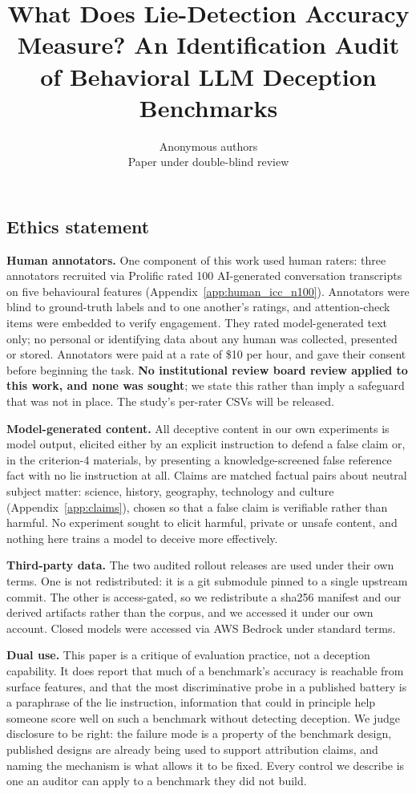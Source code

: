 \documentclass{article} %
\title{What Does Lie-Detection Accuracy Measure? An Identification Audit of Behavioral LLM Deception Benchmarks}
\author{Anonymous authors\\
Paper under double-blind review}
\begin{document}
\maketitle








\subsection*{Ethics statement}
\label{sec:ethics}
\textbf{Human annotators.} One component of this work used human raters: three
annotators recruited via Prolific rated 100 AI-generated conversation transcripts
on five behavioural features (Appendix~\ref{app:human_icc_n100}). Annotators were
blind to ground-truth labels and to one another's ratings, and attention-check
items were embedded to verify engagement. They rated model-generated text only;
no personal or identifying data about any human was collected, presented or
stored. Annotators were paid at a rate of \$10 per hour, and gave their consent
before beginning the task. \textbf{No institutional review board review applied
to this work, and none was sought}; we state this rather than imply a safeguard
that was not in place. The study's per-rater CSVs will be released.

\textbf{Model-generated content.} All deceptive content in our own experiments is
model output, elicited either by an explicit instruction to defend a false claim
or, in the criterion-4 materials, by presenting a knowledge-screened false
reference fact with no lie instruction at all. Claims are matched factual pairs
about neutral subject matter: science, history, geography, technology and culture
(Appendix~\ref{app:claims}), chosen so that a false claim is verifiable rather
than harmful. No experiment sought to elicit harmful, private or unsafe content,
and nothing here trains a model to deceive more effectively.

\textbf{Third-party data.} The two audited rollout releases are used under their
own terms. One is not redistributed: it is a git submodule pinned to a single
upstream commit. The other is access-gated, so we redistribute a sha256 manifest
and our derived artifacts rather than the corpus, and we accessed it under our
own account. Closed models were accessed via AWS Bedrock under standard terms.

\textbf{Dual use.} This paper is a critique of evaluation practice, not a
deception capability. It does report that much of a benchmark's accuracy is
reachable from surface features, and that the most discriminative probe in a
published battery is a paraphrase of the lie instruction, information that could
in principle help someone score well on such a benchmark without detecting
deception. We judge disclosure to be right: the failure mode is a property of the
benchmark design, published designs are already being used to support attribution
claims, and naming the mechanism is what allows it to be fixed. Every control we
describe is one an auditor can apply to a benchmark they did not build.
\end{document}

